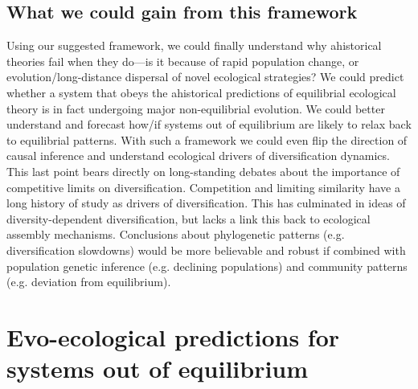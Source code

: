 \documentclass[12pt]{article}
\providecommand{\DIFdelend}{} %
\begin{document}
\DIFdelend %
\subsection{What we could gain from this framework}

Using our suggested framework, we could finally understand why ahistorical theories fail when
they do---is it because of rapid population change, or
evolution/long-distance dispersal of novel ecological strategies? We
could predict whether a system that obeys the ahistorical predictions
of equilibrial ecological theory is in fact undergoing major
non-equilibrial evolution. We could better understand and forecast
how/if systems out of equilibrium are likely to relax back to
equilibrial patterns. With such a framework we could even flip the
direction of causal inference and understand ecological drivers of
diversification dynamics. This last point bears directly on
long-standing  debates about the importance of competitive
limits on diversification. Competition and limiting similarity have a
long history of study as drivers of diversification. This has
culminated in ideas of diversity-dependent
diversification\citep{Etienne2012-ky, Rabosky2013-gk, Rabosky2008-bs}, but lacks a
 link this back to ecological assembly
mechanisms. Conclusions about phylogenetic patterns (e.g. diversification
slowdowns) would be more believable and robust if combined with
population genetic inference (e.g. declining populations) and
community patterns (e.g.  deviation from equilibrium).

\section{Evo-ecological predictions for systems out of equilibrium} \label{sec:pred}
\end{document}
